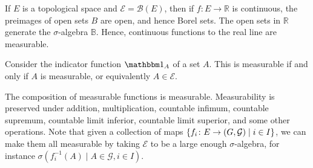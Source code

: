 If \( E \) is a topological space and \( \mathcal E = \mathcal B(E) \), then if \( f \colon E \to \mathbb R \) is continuous, the preimages of open sets \( B \) are open, and hence Borel sets.
The open sets in \( \mathbb R \) generate the \( \sigma \)-algebra \( \mathbb B \).
Hence, continuous functions to the real line are measurable.
\begin{example}
	Consider the indicator function \( \mathbbm 1_A \) of a set \( A \).
	This is measurable if and only if \( A \) is measurable, or equivalently \( A \in \mathcal E \).
\end{example}
\begin{example}
	The composition of measurable functions is measurable.
	Measurability is preserved under addition, multiplication, countable infimum, countable supremum, countable limit inferior, countable limit superior, and some other operations.
	Note that given a collection of maps \( \qty{f_i \colon E \to (G,\mathcal G) \mid i \in I} \), we can make them all measurable by taking \( \mathcal E \) to be a large enough \( \sigma \)-algebra, for instance \( \sigma({f_i^{-1}(A) \mid A \in \mathcal G, i \in I}) \).
\end{example}

